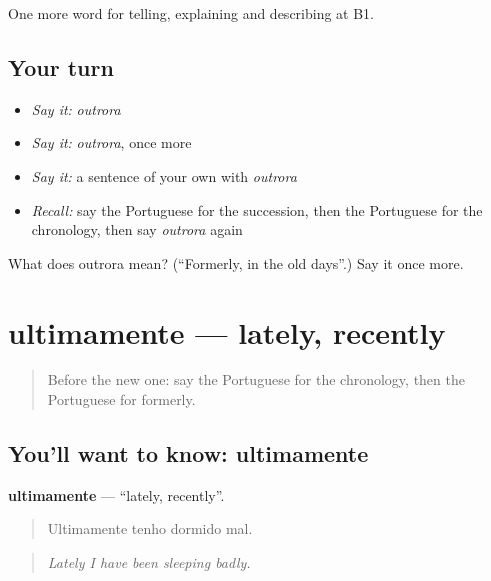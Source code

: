 \begin{grammarlens}[title={What you've built}]
One more word for telling, explaining and describing at B1.
\end{grammarlens}

\subsection*{Your turn}
\begin{itemize}
\raggedright
  \item \emph{Say it:} \emph{outrora}
  \item \emph{Say it:} \emph{outrora}, once more
  \item \emph{Say it:} a sentence of your own with \emph{outrora}
  \item \emph{Recall:} say the Portuguese for the succession, then the Portuguese for the chronology, then say \emph{outrora} again
\end{itemize}

\begin{tcolorbox}[breakable,colback=teal!4,colframe=teal!35!black,title={Before you move on}]
What does outrora mean? (\textquotedblleft{}Formerly, in the old days\textquotedblright{}.) Say it once more.
\end{tcolorbox}
\section[ultimamente]{ultimamente — lately, recently}

\label{lesson:PT-C274-ultimamente}



\begin{quote}
Before the new one: say the Portuguese for the chronology, then the Portuguese for formerly.
\end{quote}

\subsection*{You'll want to know: ultimamente}
\textbf{ultimamente} — \textquotedblleft{}lately, recently\textquotedblright{}.

\begin{quote}
Ultimamente tenho dormido mal.
\end{quote}

\begin{quote}
\emph{Lately I have been sleeping badly.}
\end{quote}


